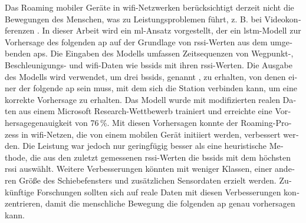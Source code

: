 \null\vfil
\begin{otherlanguage}{ngerman}
\begin{center}\textsf{\textbf{\abstractname}}\end{center}

\noindent
Das Roaming mobiler Geräte in \ac{wifi}-Netzwerken berücksichtigt derzeit nicht die Bewegungen des Menschen, was zu Leistungsproblemen führt, z. B. bei Videokonferenzen \cite{handoff_performance_issues}.
In dieser Arbeit wird ein \ac{ml}-Ansatz vorgestellt, der ein \ac{lstm}-Modell zur Vorhersage des folgenden \ac{ap} auf der Grundlage von \ac{rssi}-Werten aus dem umgebenden \acp{ap}.
Die Eingaben des Modells umfassen Zeitsequenzen von Wegpunkt-, Beschleunigungs- und \ac{wifi}-Daten wie \acp{bssid} mit ihren \ac{rssi}-Werten.
Die Ausgabe des Modells wird verwendet, um drei \acp{bssid}, genannt \threeAP, zu erhalten, von denen einer der folgende \ac{ap} sein muss, mit dem sich die Station verbinden kann, um eine korrekte Vorhersage zu erhalten.
Das Modell wurde mit modifizierten realen Daten aus einem Microsoft Research-Wettbewerb trainiert und erreichte eine Vorhersagegenauigkeit von 76\,\%.
Mit diesen Vorhersagen konnte der Roaming-Prozess in \ac{wifi}-Netzen, die von einem mobilen Gerät initiiert werden, verbessert werden.
Die Leistung war jedoch nur geringfügig besser als eine heuristische Methode, die aus den zuletzt gemessenen \ac{rssi}-Werten die \acp{bssid} mit dem höchsten \ac{rssi} auswählt.
Weitere Verbesserungen könnten mit weniger Klassen, einer anderen Größe des Schiebefensters und zusätzlichen Sensordaten erzielt werden.
Zukünftige Forschungen sollten sich auf reale Daten mit diesen Verbesserungen konzentrieren, damit die menschliche Bewegung die folgenden \ac{ap} genau vorhersagen kann.
\end{otherlanguage}
\vfil\null

\acresetall
